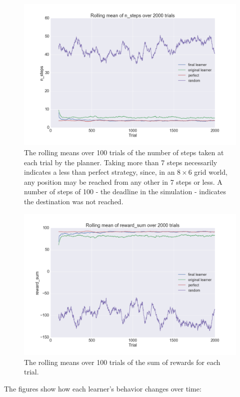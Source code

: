 \documentclass{article}
\begin{document}
\begin{figure}
\includegraphics[width=\textwidth]{roll_mean_n_steps}
\centering
\caption{The rolling means over 100 trials of the number of steps taken at each trial by the planner. Taking more than 7 steps necessarily indicates a less than perfect strategy, since, in an $8\times6$ grid world, any position may be reached from any other in 7 steps or less. A number of steps of 100 - the deadline in the simulation - indicates the destination was not reached.}
\end{figure}

\begin{figure}
\includegraphics[width=\textwidth]{roll_mean_reward_sum}
\centering
\caption{The rolling means over 100 trials of the sum of rewards for each trial.}
\end{figure}

The figures show how each learner's behavior changes over time:
\end{document}
